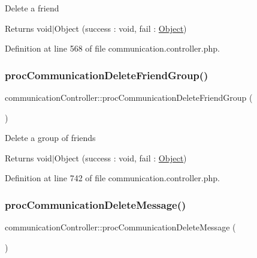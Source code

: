 Delete a friend \begin{DoxyReturn}{Returns}
void$\vert$\+Object (success \+: void, fail \+: \hyperlink{classObject}{Object}) 
\end{DoxyReturn}


Definition at line 568 of file communication.\+controller.\+php.

\hypertarget{classcommunicationController_ab09ca02f677729eb87ca2b3671d54621}{}\label{classcommunicationController_ab09ca02f677729eb87ca2b3671d54621} 
\subsubsection{\texorpdfstring{proc\+Communication\+Delete\+Friend\+Group()}{procCommunicationDeleteFriendGroup()}}
{\footnotesize\ttfamily communication\+Controller\+::proc\+Communication\+Delete\+Friend\+Group (\begin{DoxyParamCaption}{ }\end{DoxyParamCaption})}

Delete a group of friends \begin{DoxyReturn}{Returns}
void$\vert$\+Object (success \+: void, fail \+: \hyperlink{classObject}{Object}) 
\end{DoxyReturn}


Definition at line 742 of file communication.\+controller.\+php.

\hypertarget{classcommunicationController_a48f939eabc293aae65e4285b5ebb35c5}{}\label{classcommunicationController_a48f939eabc293aae65e4285b5ebb35c5} 
\subsubsection{\texorpdfstring{proc\+Communication\+Delete\+Message()}{procCommunicationDeleteMessage()}}
{\footnotesize\ttfamily communication\+Controller\+::proc\+Communication\+Delete\+Message (\begin{DoxyParamCaption}{ }\end{DoxyParamCaption})}

